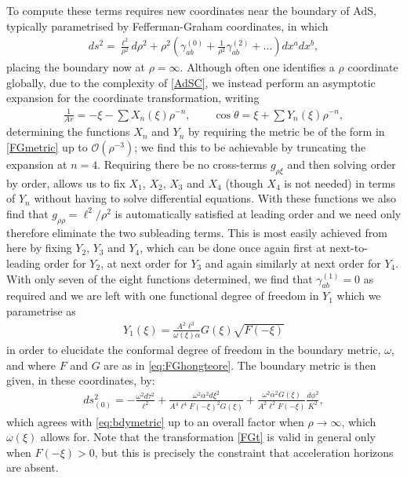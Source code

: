 \documentclass[
twoside,
openright,
frontopenright,
]{dmathesis}
\begin{document}
To compute these terms requires new coordinates near the boundary
of AdS, typically parametrised by Fefferman-Graham
coordinates, in which
\begin{align}
ds^2= \frac{\ell^2}{\rho^2} d\rho^2 +
\rho^2 \left ( \gamma_{ab}^{(0)} + \frac1{\rho^2} \gamma^{(2)}_{ab}
+ ...\right )  dx^a dx^b,
\label{FGmetric}
\end{align}
placing the boundary now at $\rho=\infty$. Although often one identifies a
$\rho$ coordinate globally, due to the complexity of \eqref{AdSC}, we instead
perform an asymptotic expansion for the coordinate transformation, writing
\begin{align}\label{FGt}
\frac{1}{Ar}= -\xi-\sum X_{n}\left( \xi \right) \rho ^{-n}, \qquad
\cos \theta = \xi+\sum Y_{n}\left( \xi\right) \rho ^{-n},
\end{align}
determining the functions $X_n$ and $Y_n$ by requiring the metric be of the form
in \cref{FGmetric} up to $\mathcal{O}(\rho^{-3})$; we find this to be achievable
by truncating the expansion at $n=4$. Requiring there be no cross-terms
$g_{\rho\xi}$ and then solving order by order, allows us to fix $X_1$, $X_2$,
$X_3$ and $X_4$ (though $X_4$ is not needed) in terms of $Y_n$ without having to
solve differential equations. With these functions we also find that
$g_{\rho\rho}=\ell^2/\rho^2$ is automatically satisfied at leading order and we
need only therefore eliminate the two subleading terms. This is most easily
achieved from here by fixing $Y_2$, $Y_3$ and $Y_4$, which can be done once
again first at next-to-leading order for $Y_2$, at next order for $Y_3$ and
again similarly at next order for $Y_4$. With only seven of the eight functions
determined, we find that $\gamma_{ab}^{(1)}=0$ as required and we are left with
one functional degree of freedom in $Y_1$ which we parametrise as
\begin{align}
  Y_1(\xi) = \frac{A^2\ell^3}{\omega(\xi)\alpha}G(\xi)\sqrt{F(-\xi)}
\end{align}
in order to elucidate the conformal degree of freedom in the boundary metric,
$\omega$, and where $F$ and $G$ are as in \cref{eq:FGhongteore}. The boundary
metric is then given, in these coordinates, by:
\begin{align}\label{bndymet}
ds_{(0)}^2
= -\frac{\omega^{2}d\tau^2}{\ell^{2}}
+\frac{\omega^2\alpha^2 d\xi^2}{A^4\ell^4F(-\xi)^2G(\xi)}
+ \frac{\omega^2\alpha^2G(\xi)}{A^2\ell^2F(-\xi)}\frac{d\phi^2}{K^2},
\end{align}
which agrees with \cref{eq:bdymetric} up to an overall factor when
$\rho\to\infty$, which $\omega(\xi)$ allows for.  Note that the transformation
\eqref{FGt} is valid in general only when $F(-\xi)>0$, but this is precisely the
constraint that acceleration horizons are absent.
\end{document}

